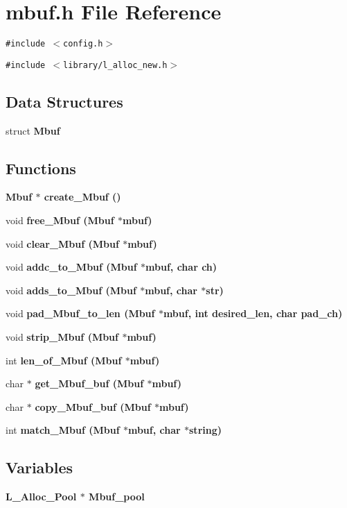 \section{mbuf.h File Reference}
\label{mbuf_8h}
{\tt \#include $<$config.h$>$}\par
{\tt \#include $<$library/l\_\-alloc\_\-new.h$>$}\par
\subsection*{Data Structures}
\begin{CompactItemize}
\item 
struct \bf{Mbuf}
\end{CompactItemize}
\subsection*{Functions}
\begin{CompactItemize}
\item 
\bf{Mbuf} $\ast$ \bf{create\_\-Mbuf} ()
\item 
void \bf{free\_\-Mbuf} (\bf{Mbuf} $\ast$mbuf)
\item 
void \bf{clear\_\-Mbuf} (\bf{Mbuf} $\ast$mbuf)
\item 
void \bf{addc\_\-to\_\-Mbuf} (\bf{Mbuf} $\ast$mbuf, char ch)
\item 
void \bf{adds\_\-to\_\-Mbuf} (\bf{Mbuf} $\ast$mbuf, char $\ast$str)
\item 
void \bf{pad\_\-Mbuf\_\-to\_\-len} (\bf{Mbuf} $\ast$mbuf, int desired\_\-len, char pad\_\-ch)
\item 
void \bf{strip\_\-Mbuf} (\bf{Mbuf} $\ast$mbuf)
\item 
int \bf{len\_\-of\_\-Mbuf} (\bf{Mbuf} $\ast$mbuf)
\item 
char $\ast$ \bf{get\_\-Mbuf\_\-buf} (\bf{Mbuf} $\ast$mbuf)
\item 
char $\ast$ \bf{copy\_\-Mbuf\_\-buf} (\bf{Mbuf} $\ast$mbuf)
\item 
int \bf{match\_\-Mbuf} (\bf{Mbuf} $\ast$mbuf, char $\ast$string)
\end{CompactItemize}
\subsection*{Variables}
\begin{CompactItemize}
\item 
\bf{L\_\-Alloc\_\-Pool} $\ast$ \bf{Mbuf\_\-pool}
\end{CompactItemize}


